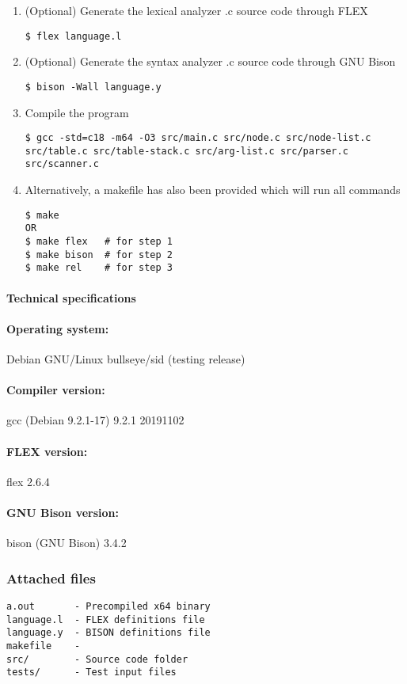 \begin{enumerate}
\item (Optional) Generate the lexical analyzer .c source code through FLEX
\begin{lstlisting}
$ flex language.l
\end{lstlisting}

\item (Optional) Generate the syntax analyzer .c source code through GNU Bison
\begin{lstlisting}
$ bison -Wall language.y
\end{lstlisting}

\item Compile the program
\begin{lstlisting}
$ gcc -std=c18 -m64 -O3 src/main.c src/node.c src/node-list.c src/table.c src/table-stack.c src/arg-list.c src/parser.c src/scanner.c
\end{lstlisting}

\item Alternatively, a makefile has also been provided which will run all commands
\begin{lstlisting}
$ make
OR
$ make flex   # for step 1
$ make bison  # for step 2
$ make rel    # for step 3
\end{lstlisting}
\end{enumerate}

\paragraph{Technical specifications}
\paragraph{Operating system:} Debian GNU/Linux bullseye/sid (testing release)
\paragraph{Compiler version:} gcc (Debian 9.2.1-17) 9.2.1 20191102
\paragraph{FLEX version:} flex 2.6.4
\paragraph{GNU Bison version:} bison (GNU Bison) 3.4.2

\subsubsection{Attached files}
\begin{lstlisting}
a.out       - Precompiled x64 binary
language.l  - FLEX definitions file
language.y  - BISON definitions file
makefile    - 
src/        - Source code folder
tests/      - Test input files
\end{lstlisting}

